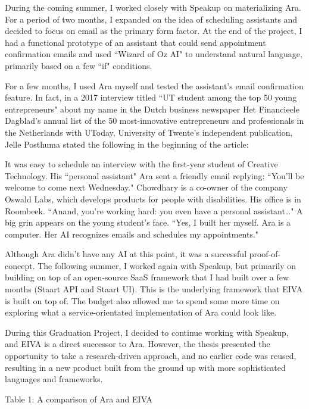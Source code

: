 \documentclass{article}
\begin{document}
During the coming summer, I worked closely with Speakup on materializing Ara. For a period of two months, I expanded on the idea of scheduling assistants and decided to focus on email as the primary form factor. At the end of the project, I had a functional prototype of an assistant that could send appointment confirmation emails and used ``Wizard of Oz AI" to understand natural language, primarily based on a few ``if" conditions.

For a few months, I used Ara myself and tested the assistant's email confirmation feature. In fact, in a 2017 interview titled ``UT student among the top 50 young entrepreneurs" about my name in the Dutch business newspaper Het Financieele Dagblad's annual list of the 50 most-innovative entrepreneurs and professionals in the Netherlands with UToday, University of Twente's independent publication, Jelle Posthuma stated the following in the beginning of the article:

\begin{displayquote}
	It was easy to schedule an interview with the first-year student of Creative Technology. His ``personal assistant" Ara sent a friendly email replying: ``You’ll be welcome to come next Wednesday." Chowdhary is a co-owner of the company Oswald Labs, which develops products for people with disabilities. His office is in Roombeek. ``Anand, you’re working hard: you even have a personal assistant…" A big grin appears on the young student’s face. ``Yes, I built her myself. Ara is a computer. Her AI recognizes emails and schedules my appointments."
\end{displayquote}

Although Ara didn't have any AI at this point, it was a successful proof-of-concept. The following summer, I worked again with Speakup, but primarily on building on top of an open-source SaaS framework that I had built over a few months (Staart API and Staart UI). This is the underlying framework that EIVA is built on top of. The budget also allowed me to spend some more time on exploring what a service-orientated implementation of Ara could look like.

During this Graduation Project, I decided to continue working with Speakup, and EIVA is a direct successor to Ara. However, the thesis presented the opportunity to take a research-driven approach, and no earlier code was reused, resulting in a new product built from the ground up with more sophisticated languages and frameworks.

Table 1: A comparison of Ara and EIVA
\end{document}
